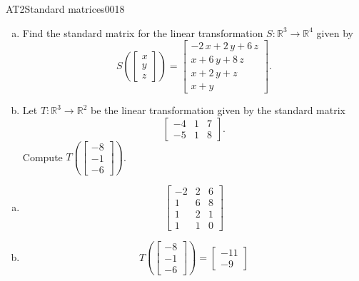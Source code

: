 \begin{exercise}{AT2}{Standard matrices}{0018} 
\begin{exerciseStatement} 

\begin{enumerate}[(a)]
\item Find the standard matrix for the linear transformation \(S:\mathbb{R}^3 \to \mathbb{R}^4\) given by \[S\left( \left[\begin{array}{c}
x \\
y \\
z
\end{array}\right] \right) = \left[\begin{array}{c}
-2 \, x + 2 \, y + 6 \, z \\
x + 6 \, y + 8 \, z \\
x + 2 \, y + z \\
x + y
\end{array}\right].\] 
\item Let \(T:\mathbb{R}^3 \to \mathbb{R}^2\) be the linear transformation given by the standard matrix \[\left[\begin{array}{ccc}
-4 & 1 & 7 \\
-5 & 1 & 8
\end{array}\right].\] Compute \(T\left(\left[\begin{array}{c}
-8 \\
-1 \\
-6
\end{array}\right]\right)\). 
\end{enumerate}

     \end{exerciseStatement}
 \begin{exerciseAnswer} 

\begin{enumerate}[(a)]
\item  \[\left[\begin{array}{ccc}
-2 & 2 & 6 \\
1 & 6 & 8 \\
1 & 2 & 1 \\
1 & 1 & 0
\end{array}\right]\] 
\item  \[T\left(\left[\begin{array}{c}
-8 \\
-1 \\
-6
\end{array}\right]\right)=\left[\begin{array}{c}
-11 \\
-9
\end{array}\right]\] 
\end{enumerate}

     \end{exerciseAnswer}
 \end{exercise}


